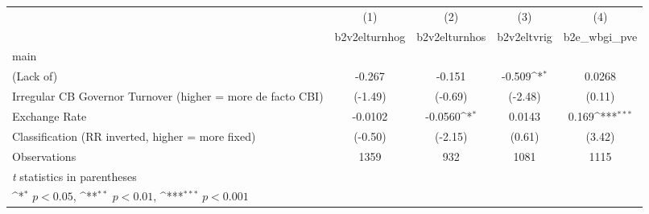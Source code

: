 {
\def\sym#1{\ifmmode^{#1}\else\(^{#1}\)\fi}
\begin{tabular}{l*{4}{c}}
\toprule
                &\multicolumn{1}{c}{(1)}&\multicolumn{1}{c}{(2)}&\multicolumn{1}{c}{(3)}&\multicolumn{1}{c}{(4)}\\
                &\multicolumn{1}{c}{b2v2elturnhog}&\multicolumn{1}{c}{b2v2elturnhos}&\multicolumn{1}{c}{b2v2eltvrig}&\multicolumn{1}{c}{b2e\_wbgi\_pve}\\
\midrule
main            &                  &                  &                  &                  \\
(Lack of)       &   -0.267         &   -0.151         &   -0.509\sym{*}  &   0.0268         \\
Irregular CB Governor Turnover (higher = more de facto CBI)&  (-1.49)         &  (-0.69)         &  (-2.48)         &   (0.11)         \\
\addlinespace
Exchange Rate   &  -0.0102         &  -0.0560\sym{*}  &   0.0143         &    0.169\sym{***}\\
Classification (RR inverted, higher = more fixed)&  (-0.50)         &  (-2.15)         &   (0.61)         &   (3.42)         \\
\midrule
Observations    &     1359         &      932         &     1081         &     1115         \\
\bottomrule
\multicolumn{5}{l}{\footnotesize \textit{t} statistics in parentheses}\\
\multicolumn{5}{l}{\footnotesize \sym{*} \(p<0.05\), \sym{**} \(p<0.01\), \sym{***} \(p<0.001\)}\\
\end{tabular}
}
